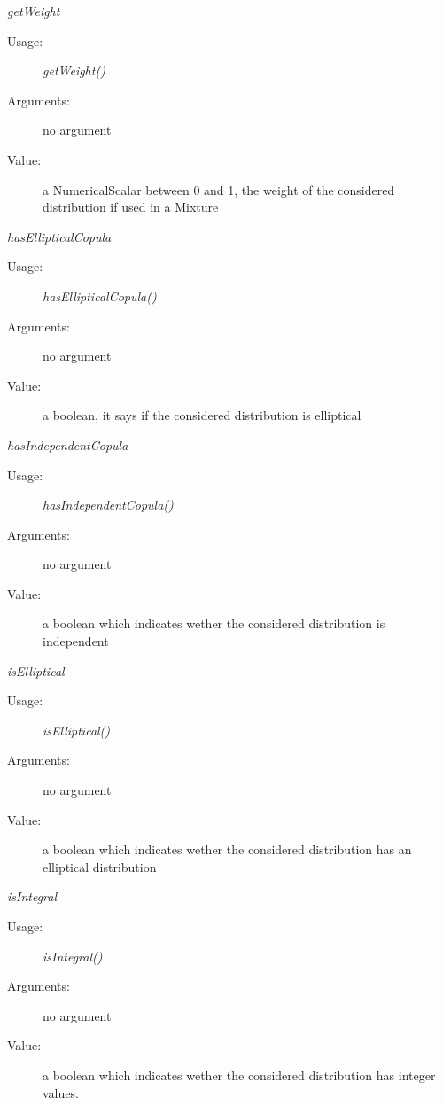 \begin{description}
\begin{description}
\item \textit{getWeight}
\begin{description}
\item[Usage:] \textit{getWeight()}
\item[Arguments:] no argument
\item[Value:] a NumericalScalar between 0 and 1, the weight of the considered distribution if used in a Mixture
\end{description}
\bigskip

\item \textit{hasEllipticalCopula}
\begin{description}
\item[Usage:] \textit{hasEllipticalCopula()}
\item[Arguments:] no argument
\item[Value:] a boolean, it says if the considered distribution is elliptical
\end{description}
\bigskip

\item \textit{hasIndependentCopula}
\begin{description}
\item[Usage:] \textit{hasIndependentCopula()}
\item[Arguments:] no argument
\item[Value:] a boolean which indicates wether the considered distribution is independent
\end{description}
\bigskip

\item \textit{isElliptical}
\begin{description}
\item[Usage:] \textit{isElliptical()}
\item[Arguments:] no argument
\item[Value:] a boolean which indicates wether the considered distribution has an elliptical distribution
\end{description}
\bigskip

\item \textit{isIntegral}
\begin{description}
\item[Usage:] \textit{isIntegral()}
\item[Arguments:] no argument
\item[Value:] a boolean which indicates wether the considered distribution has integer values.
\end{description}
\bigskip


\end{description}
\end{description}
